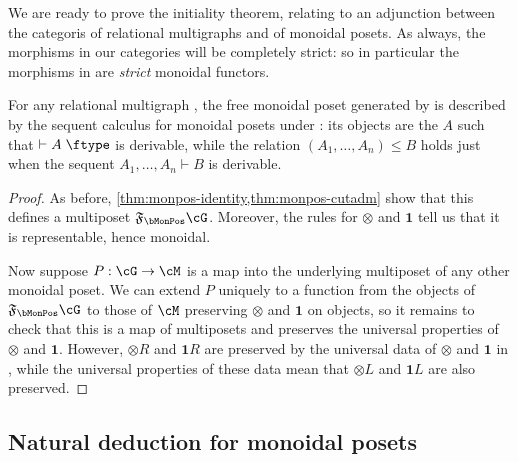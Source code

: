 \documentclass{book}
\let\types\vdash
\def\type{\;\ftype}
\newcommand{\F}[1]{\mathfrak{F}_{#1}}
\def\one{\mathbf{1}}
\let\tensor\otimes
\def\tensorL{\mathord{\tensor}L}
\def\tensorR{\mathord{\tensor}R}
\begin{document}
We are ready to prove the initiality theorem, relating to an adjunction between the categoris \bRelMGr of relational multigraphs and \bMonPos of monoidal posets.
As always, the morphisms in our categories will be completely strict: so in particular the morphisms in \bMonPos are \emph{strict} monoidal functors.

\begin{thm}\label{thm:monpos-initial}
  For any relational multigraph \cG, the free monoidal poset generated by \cG is described by the sequent calculus for monoidal posets under \cG: its objects are the $A$ such that $\types A\type$ is derivable, while the relation $(A_1,\dots,A_n)\le B$ holds just when the sequent $A_1,\dots,A_n\types B$ is derivable.
\end{thm}
\begin{proof}
  As before, \cref{thm:monpos-identity,thm:monpos-cutadm} show that this defines a multiposet $\F\bMonPos\cG$.
  Moreover, the rules for $\tensor$ and $\one$ tell us that it is representable, hence monoidal.

  Now suppose $P:\cG\to\cM$ is a map into the underlying multiposet of any other monoidal poset.
  We can extend $P$ uniquely to a function from the objects of $\F\bMonPos\cG$ to those of $\cM$ preserving $\tensor$ and $\one$ on objects, so it remains to check that this is a map of multiposets and preserves the universal properties of $\tensor$ and $\one$.
  However, $\tensorR$ and $\one R$ are preserved by the universal data of $\tensor$ and $\one$ in \cM, while the universal properties of these data mean that $\tensorL$ and $\one L$ are also preserved.
\end{proof}

\subsection{Natural deduction for monoidal posets}
\label{sec:natded-monpos}
\end{document}
